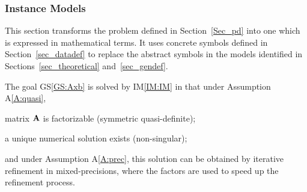 \documentclass[12pt]{article}
\newcommand{\aref}[1]{A\ref{#1}}
\newcommand{\gsref}[1]{GS\ref{#1}}
\newcommand{\iref}[1]{IM\ref{#1}}
\begin{document}
\subsubsection{Instance Models} \label{sec_instance}


This section transforms the problem defined in Section~\ref{Sec_pd} into
one which is expressed in mathematical terms. It uses concrete symbols defined
in Section~\ref{sec_datadef} to replace the abstract symbols in the models
identified in Sections~\ref{sec_theoretical} and~\ref{sec_gendef}.

The goal \gsref{GS:Axb} is solved by \iref{IM:IM} in that under Assumption
\aref{A:quasi},
\begin{enumerate*}[a)]
\item matrix \(\mathbf{A}\) is factorizable (symmetric quasi-definite);
\item a unique numerical solution exists (non-singular);
\end{enumerate*}
and under Assumption \aref{A:prec}, this solution can be obtained by iterative
refinement in mixed-precisions, where the factors are used to speed up the
refinement process.

~\newline

\end{document}

